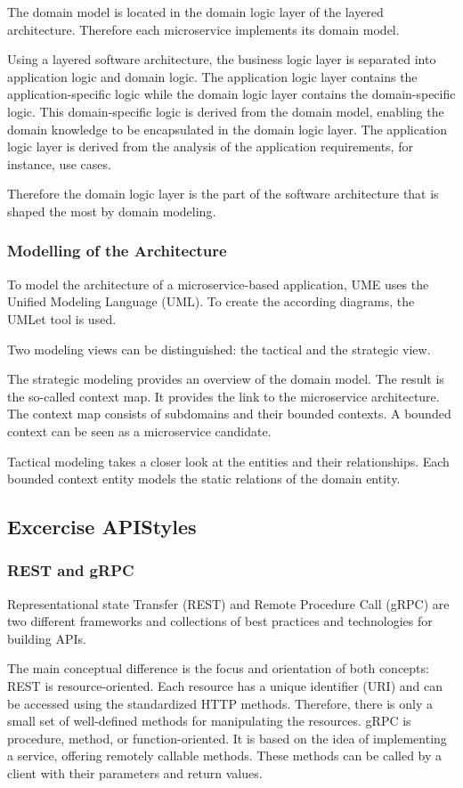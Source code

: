 The domain model is located in the domain logic layer of the layered architecture.
Therefore each microservice implements its domain model.

Using a layered software architecture, the business logic layer is separated into application logic and domain logic.
The application logic layer contains the application-specific logic while the domain logic layer contains the domain-specific logic.
This domain-specific logic is derived from the domain model, enabling the domain knowledge to be encapsulated in the domain logic layer.
The application logic layer is derived from the analysis of the application requirements, for instance, use cases.

Therefore the domain logic layer is the part of the software architecture that is shaped the most by domain modeling.

\subsubsection*{Modelling of the Architecture}
To model the architecture of a microservice-based application, UME uses the Unified Modeling Language (UML).
To create the according diagrams, the UMLet tool is used.

Two modeling views can be distinguished: the tactical and the strategic view.

The strategic modeling provides an overview of the domain model.
The result is the so-called context map.
It provides the link to the microservice architecture.
The context map consists of subdomains and their bounded contexts.
A bounded context can be seen as a microservice candidate.

Tactical modeling takes a closer look at the entities and their relationships.
Each bounded context entity models the static relations of the domain entity.

\subsection{Excercise APIStyles}
\label{sec:api_styles}
\subsubsection*{REST and gRPC}
Representational state Transfer (REST) and Remote Procedure Call (gRPC) are two different frameworks and collections of best practices and technologies for building APIs.

The main conceptual difference is the focus and orientation of both concepts:
REST is resource-oriented.
Each resource has a unique identifier (URI) and can be accessed using the standardized HTTP methods.
Therefore, there is only a small set of well-defined methods for manipulating the resources.
gRPC is procedure, method, or function-oriented.
It is based on the idea of implementing a service, offering remotely callable methods.
These methods can be called by a client with their parameters and return values.

